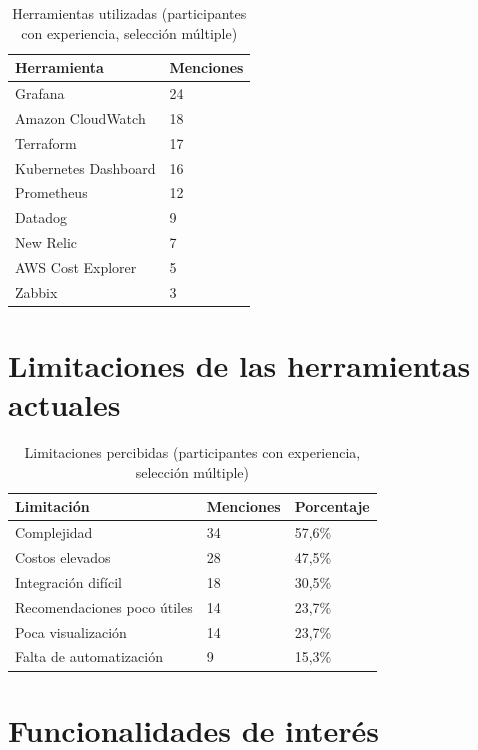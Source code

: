 \documentclass[a4paper, 12pt, oneside, openany]{book}
\begin{document}
\begin{table}[H]
\centering
\scriptsize
\caption{Herramientas utilizadas (participantes con experiencia, selección múltiple)}
\label{tab:enc-herramientas}
\begin{tabular}{|p{6cm}|p{2cm}|}
\hline
\textbf{Herramienta} & \textbf{Menciones} \\
\hline
Grafana & 24 \\
Amazon CloudWatch & 18 \\
Terraform & 17 \\
Kubernetes Dashboard & 16 \\
Prometheus & 12 \\
Datadog & 9 \\
New Relic & 7 \\
AWS Cost Explorer & 5 \\
Zabbix & 3 \\
\hline
\end{tabular}
\end{table}

\section{Limitaciones de las herramientas actuales}

\begin{table}[H]
\centering
\scriptsize
\caption{Limitaciones percibidas (participantes con experiencia, selección múltiple)}
\label{tab:enc-limitaciones}
\begin{tabular}{|p{6cm}|p{2cm}|p{3cm}|}
\hline
\textbf{Limitación} & \textbf{Menciones} & \textbf{Porcentaje} \\
\hline
Complejidad & 34 & 57,6\% \\
Costos elevados & 28 & 47,5\% \\
Integración difícil & 18 & 30,5\% \\
Recomendaciones poco útiles & 14 & 23,7\% \\
Poca visualización & 14 & 23,7\% \\
Falta de automatización & 9 & 15,3\% \\
\hline
\end{tabular}
\end{table}

\section{Funcionalidades de interés}
\end{document}
